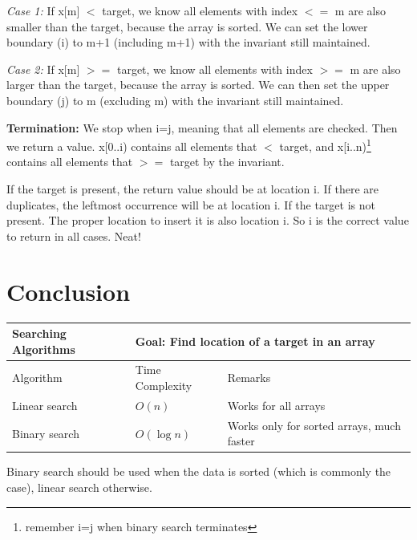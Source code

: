 \textit{Case 1:} If x[m] $<$ target, we know all elements with index $<=$ m are also smaller than the target, because the array is sorted. We can set the lower boundary (i) to m+1 (including m+1) with the invariant still maintained.

\textit{Case 2:} If x[m] $>=$ target, we know all elements with index $>=$ m are also larger than the target, because the array is sorted. We can then set the upper boundary (j) to m (excluding m) with the invariant still maintained.
\vspace{6mm}

\textbf{Termination:} We stop when i=j, meaning that all elements are checked. Then we return a value. x[0..i) contains all elements that $<$ target, and x[i..n)\footnote{remember i=j when binary search terminates} contains all elements that $>=$ target by the invariant. 

If the target is present, the return value should be at location i. If there are duplicates, the leftmost occurrence will be at location i. If the target is not present. The proper location to insert it is also location i. So i is the correct value to return in all cases. Neat!
\vspace{6mm}

\fi

\section{Conclusion}

\begin{table}[h]
    \centering
    \begin{tabular}{|m{6em}|m{9em}|m{18em}|}
        \hline  
        \textbf{Searching Algorithms} & 
        \multicolumn{2}{l|}{Goal: Find location of a target in an array}
        \\ \hline \hline
        
        Algorithm &
        Time Complexity & 
        Remarks
        \\ \hline \hline
        
        Linear search &
        $O(n)$ &
        Works for all arrays
        \\ \hline
        
        Binary search &
        $O(\log n)$ &
        Works only for sorted arrays, much faster
        \\ \hline
    \end{tabular}
\end{table}

Binary search should be used when the data is sorted (which is commonly the case), linear search otherwise.